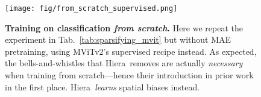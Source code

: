 \documentclass[nohyperref]{article}
\newcommand{\shortname}{{Hiera}}
\theoremstyle{plain}
\theoremstyle{definition}
\theoremstyle{remark}
\begin{document}
\begin{figure}[t!]
    \centering
    \texttt{[image: fig/from\_scratch\_supervised.png]}
    \caption{{\bf Training on classification \textit{from scratch}.} Here we repeat the experiment in Tab.~\ref{tab:sparsifying_mvit} but without MAE pretraining, using MViTv2's supervised recipe instead. As expected, the bells-and-whistles that \shortname{}~removes are actually \textit{necessary} when training from scratch---hence their introduction in prior work in the first place. \shortname{}~\textit{learns} spatial biases instead.}
    \label{fig:from_scratch_supervised}
\end{figure}



\clearpage


\end{document}
